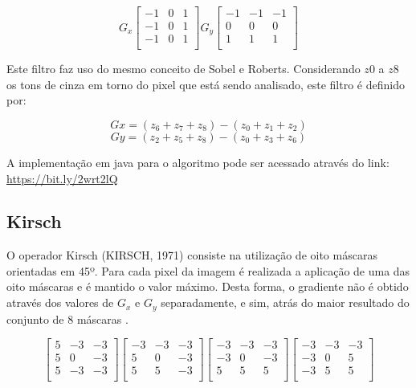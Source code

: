 \documentclass[
	12pt,				%
	oneside,			%
	a4paper,			%
	english,			%
	french,				%
	spanish,			%
	brazil,				%
	]{abntex2}
\begin{document}
\[
G_x
\begin{bmatrix}
    -1 & 0 & 1   \\ 
	-1 & 0 & 1   \\ 
	-1 & 0 & 1   \\    
\end{bmatrix} 
G_y
\begin{bmatrix}
    -1 & -1 & -1   \\ 
	 0 &  0 &  0   \\ 
	 1 &  1 &  1   \\    
\end{bmatrix} 
\]

Este filtro faz uso do mesmo conceito de Sobel e Roberts. Considerando \(z0\) a \(z8\) os tons de cinza em torno do pixel que está sendo analisado, este filtro é definido por:

\[Gx = (z_6 + z_7 + z_8) - (z_0 + z_1 + z_2)\]
\[Gy = (z_2 + z_5 + z_8) - (z_0 + z_3 + z_6)\]

A implementação em java para o algoritmo pode ser acessado através do link: \url{https://bit.ly/2wrt2lQ} 

\subsection{Kirsch}
O operador Kirsch (KIRSCH, 1971) consiste na utilização de oito máscaras orientadas em 45º. Para cada pixel da imagem é realizada a aplicação de uma das oito máscaras e é mantido o valor máximo. Desta forma, o gradiente não é obtido através dos valores de \(G_x\) e \(G_y\) separadamente, e sim, atrás do maior resultado do conjunto de 8 máscaras \cite{pedriniSchwartz:2008}.

\[
\begin{bmatrix}
     5 & -3 & -3   \\ 
	 5 &  0 & -3   \\ 
	 5 & -3 & -3   \\    
\end{bmatrix} 
\begin{bmatrix}
    -3 & -3 & -3   \\
	 5 &  0 & -3   \\
	 5 &  5 & -3   \\
\end{bmatrix}
\begin{bmatrix}
    -3 & -3 & -3   \\
	-3 &  0 & -3   \\
	 5 &  5 &  5   \\
\end{bmatrix} 
\begin{bmatrix}
    -3 & -3 & -3   \\
	-3 &  0 &  5   \\
	-3 &  5 &  5   \\
\end{bmatrix}
\]
\end{document}
